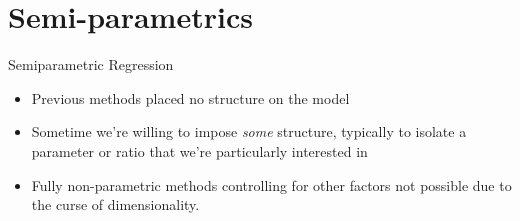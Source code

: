 \begin{comment}
\begin{frame}{Series or sieves}

\begin{itemize}
  \item This is a \textit{parametric} approximation that becomes more accurate as the sample size increases

  \item {\bf Idea:} we add regressors when we have more data, eventually providing an arbitrarily close approximation to the true regression function

  \item Polynomial Example: $ m(x;\beta_K) = \sum_{j=1}^{K} \hat \beta_j x^j$ 
  \item Given $K$, \textbf{just estimate model using OLS}
  \item In practice, you'll want to choose $K$ using leave-one-out cross validation. 
\end{itemize}

Note that simply polynomials often perform poorly in some parts of the data! 

\end{frame}


\begin{frame}{Splines: trading off fit and smoothness}

  \begin{itemize}
    \item Another option is to use splines
    \item {\bf Idea:} Approximate regression function \textit{locally} using (low order) polynomials, then connect these polynomials at knots. 
    \item The regression function will be continuous at the knots, but not as many times differentiable as elsewhere
    \item For example, can estimate a linear spline with an intercept and separate slopes depending on whether $x > x_0$
  \end{itemize}
\end{frame} 
\end{comment}

%
\section{Semi-parametrics}

\begin{frame}{Semiparametric Regression}
  \begin{itemize}
    \item Previous methods placed no structure on the model
    \item Sometime we're willing to impose \textit{some} structure, typically to isolate a parameter or ratio that we're particularly interested in
    \item Fully non-parametric methods controlling for other factors not possible due to the curse of dimensionality. 
  \end{itemize}
\end{frame}

